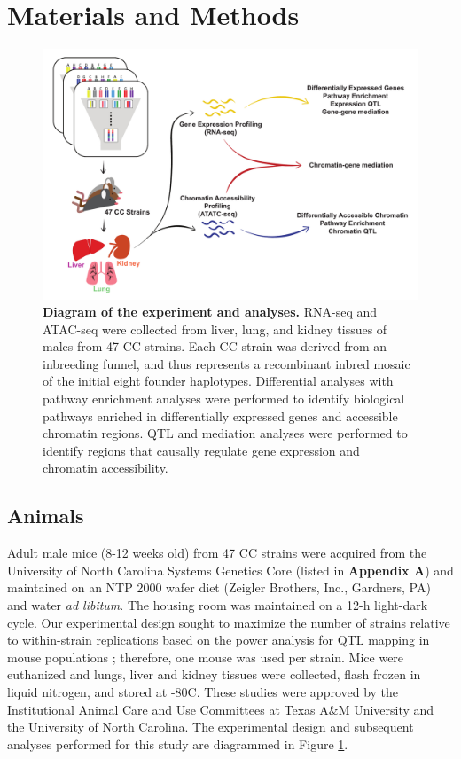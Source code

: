 \documentclass[9pt,twocolumn,twoside]{gsajnl}
\begin{document}
\section{Materials and Methods}
\label{sec:materials:methods}

\begin{figure}[htbp]
\renewcommand{\familydefault}{\sfdefault}\normalfont
\centering
\includegraphics[width=0.8\linewidth, clip, trim={0in 0.1in 0in 0.2in}]{figs/overview_diagram_simplified.pdf}
\caption{\textbf{Diagram of the experiment and analyses.} RNA-seq and ATAC-seq were collected from liver, lung, and kidney tissues of males from 47 CC strains. Each CC strain was derived from an inbreeding funnel, and thus represents a recombinant inbred mosaic of the initial eight founder haplotypes. Differential analyses with pathway enrichment analyses were performed to identify biological pathways enriched in differentially expressed genes and accessible chromatin regions. QTL and mediation analyses were performed to identify regions that causally regulate gene expression and chromatin accessibility.
\label{fig:overview}}
\end{figure}

\subsection{Animals}

Adult male mice (8-12 weeks old) from 47 CC strains were acquired from the University of North Carolina Systems Genetics Core (listed in \textbf{Appendix A}) and maintained on an NTP 2000 wafer diet (Zeigler Brothers, Inc., Gardners, PA) and water \textit{ad libitum}. The housing room was maintained on a 12-h light-dark cycle. Our experimental design sought to maximize the number of strains relative to within-strain replications based on the power analysis for QTL mapping in mouse populations \citep{Kaeppler1997}; therefore, one mouse was used per strain. Mice were euthanized and lungs, liver and kidney tissues were collected, flash frozen in liquid nitrogen, and stored at -80\degree C. These studies were approved by the Institutional Animal Care and Use Committees at Texas A\&M University and the University of North Carolina. The experimental design and subsequent analyses performed for this study are diagrammed in Figure \ref{fig:overview}.
\end{document}
